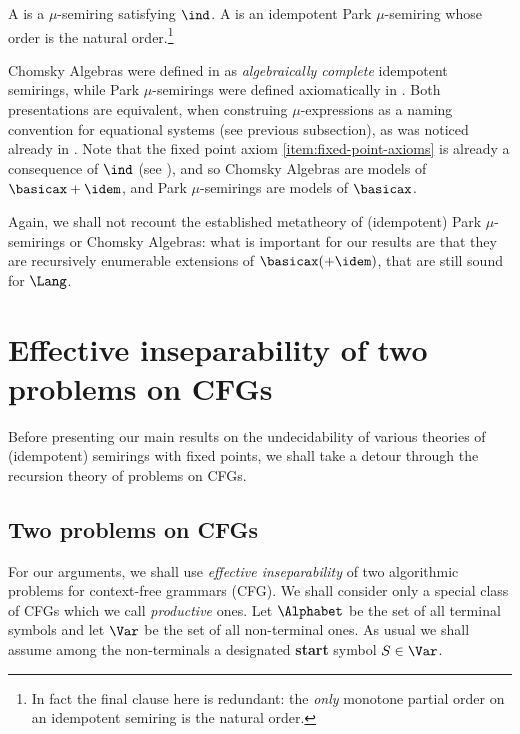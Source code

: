 \begin{definition}
        A  is a $\mu$-semiring satisfying $\ind$. A  is an idempotent Park $\mu$-semiring whose order is the natural order.\footnote{In fact the final clause here is redundant: the \emph{only} monotone partial order on an idempotent semiring is the natural order.}
\end{definition}

Chomsky Algebras were defined in \cite{GHK13,Leiss16} as \emph{algebraically complete} idempotent semirings, while Park $\mu$-semirings were defined axiomatically in \cite{EsikLeiss02,EsikLeiss05}. 
Both presentations are equivalent, when construing $\mu$-expressions as a naming convention for equational systems (see previous subsection), as was noticed already in \cite{GHK13}.
Note that the fixed point axiom \eqref{item:fixed-point-axioms} is already a consequence of $\ind$ (see \cite{EsikLeiss02,EsikLeiss05}), and so Chomsky Algebras are models of $\basicax+\idem$, and Park $\mu$-semirings are models of $\basicax$.



Again, we shall not recount the established metatheory of (idempotent) Park $\mu$-semirings or Chomsky Algebras: what is important for our results are that they are recursively enumerable extensions of $\basicax (+ \idem)$, that are still sound for $\Lang$.

% 

\section{Effective inseparability of two problems on CFGs}
\label{sec:eff-insep}

Before presenting our main results on the undecidability of various theories of (idempotent) semirings with fixed points, we shall take a detour through the recursion theory of problems on CFGs.

\subsection{Two problems on CFGs}

For our arguments, we shall use {\em effective inseparability} of two algorithmic problems for context-free grammars (CFG). 
We shall consider only a special class of CFGs which we call \emph{productive} ones. Let $\Alphabet$ be the set of all terminal symbols and let $\Var$ be the set of all non-terminal ones.
As usual we shall assume among the non-terminals a designated \textbf{start} symbol $S \in \Var$.

